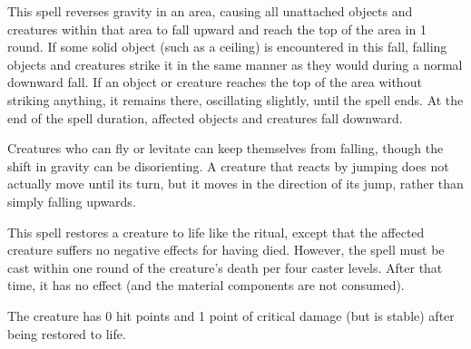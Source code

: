 \spellrng{\rngclose}
\begin{spelleffect}
  This spell reverses gravity in an area, causing all unattached objects and creatures within that area to fall upward and reach the top of the area in 1 round. If some solid object (such as a ceiling) is encountered in this fall, falling objects and creatures strike it in the same manner as they would during a normal downward fall. If an object or creature reaches the top of the area without striking anything, it remains there, oscillating slightly, until the spell ends. At the end of the spell duration, affected objects and creatures fall downward.
\end{spelleffect}
\begin{spellnotes}
  Creatures who can fly or levitate can keep themselves from falling, though the shift in gravity can be disorienting. A creature that reacts by jumping does not actually move until its turn, but it moves in the direction of its jump, rather than simply falling upwards.
\end{spellnotes}

\begin{spelleffect}
  This spell restores a creature to life like the  ritual, except that the affected creature suffers no negative effects for having died. However, the spell must be cast within one round of the creature's death per four caster levels. After that time, it has no effect (and the material components are not consumed).

  The creature has 0 hit points and 1 point of critical damage (but is stable) after being restored to life.
\end{spelleffect}

